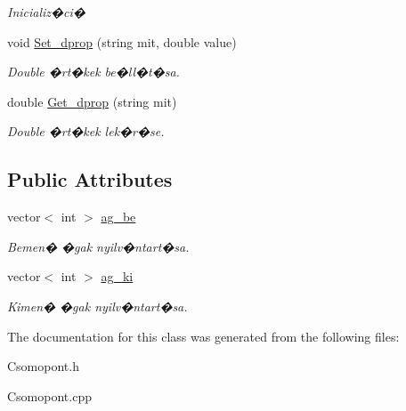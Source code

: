 \begin{DoxyCompactItemize}
\begin{DoxyCompactList}\small\item\em Inicializ�ci� \end{DoxyCompactList}\item 
void \hyperlink{class_csomopont_af64637d5f8124e9f3d121c7d941140fe}{Set\+\_\+dprop} (string mit, double value)\hypertarget{class_csomopont_af64637d5f8124e9f3d121c7d941140fe}{}\label{class_csomopont_af64637d5f8124e9f3d121c7d941140fe}

\begin{DoxyCompactList}\small\item\em Double �rt�kek be�ll�t�sa. \end{DoxyCompactList}\item 
double \hyperlink{class_csomopont_aab439a6b1e8b645a1efa4be53d065f11}{Get\+\_\+dprop} (string mit)\hypertarget{class_csomopont_aab439a6b1e8b645a1efa4be53d065f11}{}\label{class_csomopont_aab439a6b1e8b645a1efa4be53d065f11}

\begin{DoxyCompactList}\small\item\em Double �rt�kek lek�r�se. \end{DoxyCompactList}\end{DoxyCompactItemize}
\subsection*{Public Attributes}
\begin{DoxyCompactItemize}
\item 
vector$<$ int $>$ \hyperlink{class_csomopont_a7244492608d916d60482d20dc58ea2ea}{ag\+\_\+be}\hypertarget{class_csomopont_a7244492608d916d60482d20dc58ea2ea}{}\label{class_csomopont_a7244492608d916d60482d20dc58ea2ea}

\begin{DoxyCompactList}\small\item\em Bemen� �gak nyilv�ntart�sa. \end{DoxyCompactList}\item 
vector$<$ int $>$ \hyperlink{class_csomopont_a656bdaccf4486a668bfc158d10553ddc}{ag\+\_\+ki}\hypertarget{class_csomopont_a656bdaccf4486a668bfc158d10553ddc}{}\label{class_csomopont_a656bdaccf4486a668bfc158d10553ddc}

\begin{DoxyCompactList}\small\item\em Kimen� �gak nyilv�ntart�sa. \end{DoxyCompactList}\end{DoxyCompactItemize}


The documentation for this class was generated from the following files\+:\begin{DoxyCompactItemize}
\item 
Csomopont.\+h\item 
Csomopont.\+cpp\end{DoxyCompactItemize}
